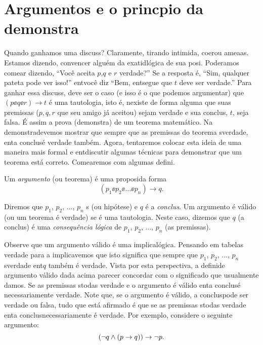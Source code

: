 \section{Argumentos e o princ\ih pio da demonstra\cao}\label{demonstracao}

Quando ganhamos uma discuss\aoi? Claramente, tirando intimida\caoi, coer\cao ou amea\cc as. Estamos dizendo, convencer algu\'em da exatid\ao l\'ogica de sua posi\caoi. Poder\ih amos come\cc ar dizendo, ``Voc\^e aceita $p$,$q$ e $r$ verdade?'' Se a resposta \'e, ``Sim, qualquer pateta pode ver isso!'' ent\ao voc\^e diz ``Bem, ent\ao segue que $t$ deve ser verdade.'' Para ganhar essa discuss\aoi, deve ser o caso (e isso \'e o que podemos argumentar) que $(p\ee q\ee r)\to t$ \'e uma tautologia, isto \'e, n\ao existe de forma alguma que suas premissas ($p,q,r$ que seu amigo j\'a aceitou) sejam verdade e sua conclus\aoi, $t$, seja falsa. \'E assim a prova (demonstra\caoi) de um teorema matem\'atico. Na demonstra\cao devemos mostrar que sempre que as premissas do teorema s\ao verdade, ent\ao a conclus\ao \'e verdade tamb\'em. Agora, tentaremos colocar esta ideia de uma maneira mais formal e ent\ao discutir algumas t\'ecnicas para demonstrar que um teorema est\'a correto. Come\cc aremos com algumas defini\cois. 

Um {\it argumento} (ou teorema) \'e uma proposi\cao da forma
\[
(p_1\ee p_2\ee ... \ee p_n)\to q.
\] 

Diremos que $p_1$, $p_2$, ..., $p_n$ s (ou hip\'otese) e $q$ \'e a {\it conclus\aoi}. Um argumento \'e v\'alido (ou um teorema \'e verdade) se \'e uma tautologia. Neste caso, dizemos que $q$ (a conclus\aoi) \'e uma {\it consequ\^encia l\'ogica} de $p_1$, $p_2$, ..., $p_n$ (as premissas). 

Observe que um argumento v\'alido \'e uma implica\cao l\'ogica. Pensando em tabelas verdade para a implica\cao vemos que isto significa que sempre que $p_1$, $p_2$, ..., $p_n$ s\ao verdade ent\ao $q$ tamb\'em \'e verdade. Vista por esta perspectiva, a defini\cao de argumento v\'alido dada acima parecer concordar com o significado que usualmente damos. Se as premissas s\ao todas verdade e o argumento \'e v\'alido ent\ao a conclus\ao \'e necessariamente verdade. Note que, se o argumento \'e v\'alido, a conclus\ao pode ser verdade ou falsa, tudo que est\'a afirmado \'e que se as premissas s\ao todas verdade ent\ao a conclus\ao necessariamente \'e verdade. Por exemplo, considere o seguinte argumento:
\[
(\lnot q \wedge (p\to q))\to \lnot p.
\]

